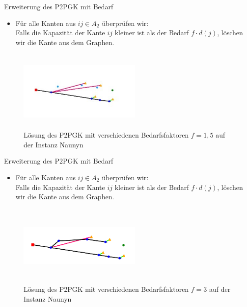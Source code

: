 \documentclass{beamer}
\begin{document}
		\begin{frame}{Erweiterung des P2PGK mit Bedarf}
			\begin{itemize}
				\item F\"ur alle Kanten aus $ij \in A_2$ \"uberpr\"ufen wir:\\
				Falls die Kapazit\"at der Kante $ij$ kleiner ist als der Bedarf  $f \cdot d(j)$,
				l\"oschen wir die Kante aus dem Graphen.
			\end{itemize}
			\begin{figure}[h]
				\centering
				\includegraphics[height=4cm, width=6cm]{./Bilder/P2PGK_Naunyn_demand1_5_duration0_2}
				\caption{Lösung des P2PGK mit verschiedenen Bedarfsfaktoren $f = 1,5$ auf der Instanz Naunyn}
			\end{figure}
		\end{frame}
		
		\begin{frame}{Erweiterung des P2PGK mit Bedarf}
			\begin{itemize}
				\item F\"ur alle Kanten aus $ij \in A_2$ \"uberpr\"ufen wir:\\
				Falls die Kapazit\"at der Kante $ij$ kleiner ist als der Bedarf  $f \cdot d(j)$,
				l\"oschen wir die Kante aus dem Graphen.
			\end{itemize}
			\begin{figure}[h]
				\centering
				\includegraphics[height=4cm, width=6cm]{./Bilder/P2PGK_Naunyn_demand3_5_duration0}
				\caption{Lösung des P2PGK mit verschiedenen Bedarfsfaktoren $f = 3$ auf der Instanz Naunyn}
			\end{figure}
		\end{frame}
\end{document}
